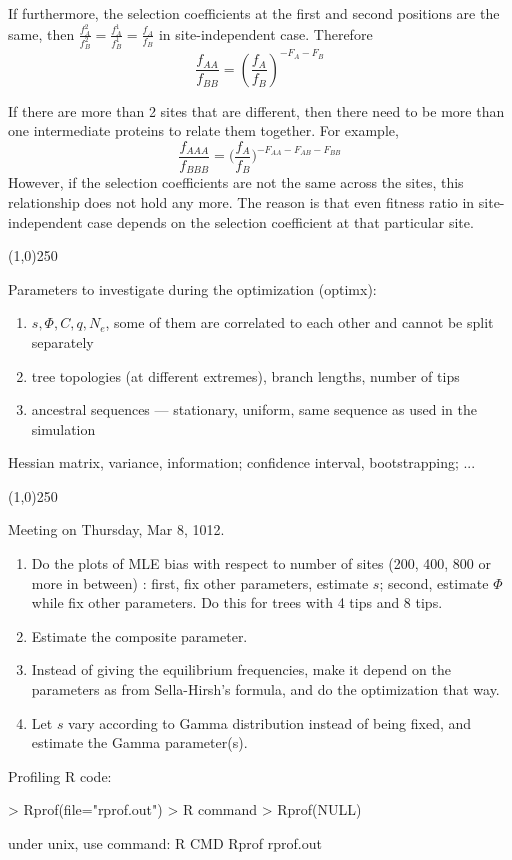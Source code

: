 \documentclass[13pt]{article}
\begin{document}
\begin{enumerate}
If furthermore, the selection coefficients at the first and second positions are the same, then $\frac{f^2_A}{f^2_B} = \frac{f^1_A}{f^1_B} = \frac{f_A}{f_B}$ in site-independent case. Therefore
\begin{equation*}
\frac{f_{AA}}{f_{BB}} = (\frac{f_A}{f_B})^{-F_A-F_B}
\end{equation*}

If there are more than 2 sites that are different, then there need to be more than one intermediate proteins to relate them together. For example,
\begin{equation*}
\frac{f_{AAA}}{f_{BBB}} = \Big(\frac{f_A}{f_B}\Big)^{-F_{AA}-F_{AB}-F_{BB}}
\end{equation*}
However, if the selection coefficients are not the same across the sites, this relationship does not hold any more. The reason is that even fitness ratio in site-independent case depends on the selection coefficient at that particular site. 
\end{enumerate}

\begin{center}
\line(1,0){250}
\end{center}

Parameters to investigate during the optimization (optimx):\\
\begin{enumerate}
\item $s, \Phi, C, q, N_e$, some of them are correlated to each other and cannot be split separately
\item tree topologies (at different extremes), branch lengths, number of tips
\item ancestral sequences --- stationary, uniform, same sequence as used in the simulation
\end{enumerate}

Hessian matrix, variance, information; confidence interval, bootstrapping; ...

\begin{center}
\line(1,0){250}
\end{center}

Meeting on Thursday, Mar 8, 1012.
\begin{enumerate}
\item Do the plots of MLE bias with respect to number of sites (200, 400, 800 or more in between) : first, fix other parameters, estimate $s$; second, estimate $\Phi$ while fix other parameters. Do this for trees with 4 tips and 8 tips.
\item Estimate the composite parameter.
\item Instead of giving the equilibrium frequencies, make it depend on the parameters as from Sella-Hirsh's formula, and do the optimization that way.
\item Let $s$ vary according to Gamma distribution instead of being fixed, and estimate the Gamma parameter(s).
\end{enumerate}

Profiling R code:

> Rprof(file="rprof.out")
> R command
> Rprof(NULL)

under unix, use command:
R CMD Rprof rprof.out
\end{document}
